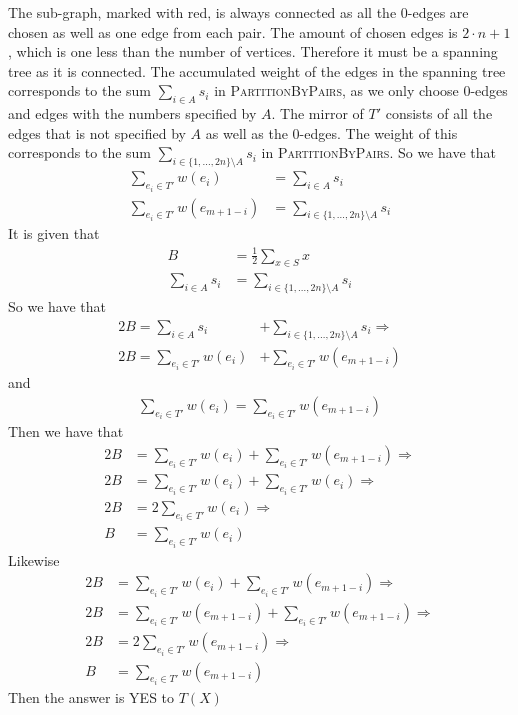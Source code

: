 The sub-graph, marked with red, is always connected as all the 0-edges are chosen as well as one edge from each pair. The amount of chosen edges is $2 \cdot n + 1$, which is one less than the number of vertices. Therefore it must be a spanning tree as it is connected. The accumulated weight of the edges in the spanning tree corresponds to the sum $\sum_{i \in A} s_i$ in \textsc{PartitionByPairs}, as we only choose 0-edges and edges with the numbers specified by $A$. The mirror of $T'$ consists of all the edges that is not specified by $A$ as well as the 0-edges. The weight of this corresponds to the sum $\sum_{i \in \{1,\ldots,2n\}\setminus A} s_i$ in \textsc{PartitionByPairs}. 
So we have that
\begin{align*}
    \sum_{e_i \in T'} w(e_i) &= \sum_{i \in A} s_i  \\
    \sum_{e_i \in T'} w(e_{m+1-i}) &= \sum_{i \in \{1,\ldots,2n\}\setminus A} s_i
\end{align*}
It is given that
\begin{align*}
    B &= \frac{1}{2} \sum_{x \in S} x \\
    \sum_{i \in A} s_i &= \sum_{i \in \{1,\ldots,2n\}\setminus A} s_i
\end{align*}
So we have that
\begin{align*}
    2B = \sum_{i \in A} s_i &+ \sum_{i \in \{1,\ldots,2n\}\setminus A} s_i \Rightarrow \\
    2B = \sum_{e_i \in T'} w(e_i) &+ \sum_{e_i \in T'} w(e_{m+1-i})
\end{align*}
and
\begin{align*}
    \sum_{e_i \in T'} w(e_i) = \sum_{e_i \in T'} w(e_{m+1-i})
\end{align*}
Then we have that
\begin{align*}
    2B &= \sum_{e_i \in T'} w(e_i) + \sum_{e_i \in T'} w(e_{m+1-i}) \Rightarrow \\
    2B &= \sum_{e_i \in T'} w(e_i) + \sum_{e_i \in T'} w(e_i) \Rightarrow \\
    2B &= 2\sum_{e_i \in T'} w(e_i) \Rightarrow\\
    B &= \sum_{e_i \in T'} w(e_i)
\end{align*}
Likewise
\begin{align*}
    2B &= \sum_{e_i \in T'} w(e_i) + \sum_{e_i \in T'} w(e_{m+1-i}) \Rightarrow \\
    2B &= \sum_{e_i \in T'} w(e_{m+1-i}) + \sum_{e_i \in T'} w(e_{m+1-i}) \Rightarrow \\
    2B &= 2\sum_{e_i \in T'} w(e_{m+1-i}) \Rightarrow\\
    B &= \sum_{e_i \in T'} w(e_{m+1-i})
\end{align*}
Then the answer is YES to $T(X)$

